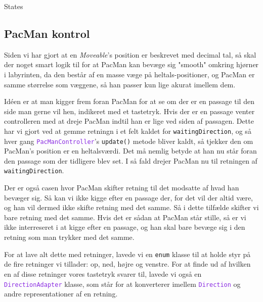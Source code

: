 \documentclass{article}
\newcommand{\code}[1]{\small\texttt{#1}}
\newcommand{\class}[1]{\textcolor{BlueViolet}{\small\texttt{#1}}}
\theoremstyle{mytheoremstyle}
\theoremstyle{mytheoremstyle}
\theoremstyle{myproblemstyle}
\begin{document}
States


\subsection{PacMan kontrol}\label{sub:PacMan Kontrol} %
Siden vi har gjort at en \textit{Moveable}'s position er beskrevet med decimal
tal, så skal der noget smart logik til for at PacMan kan bevæge sig "smooth"
omkring hjørner i labyrinten, da den består af en masse væge på
heltals-positioner, og PacMan er samme størrelse som væggene, så han passer kun
lige akurat imellem dem.

Idéen er at man kigger frem foran PacMan for at se om der er en passage til den
side man gerne vil hen, indikeret med et tastetryk. Hvis der er en passage
venter controlleren med at dreje PacMan indtil han er lige ved siden af
passagen. Dette har vi gjort ved at gemme retningn i et felt kaldet for
\code{waitingDirection}, og så hver gang \class{PacManController}'s
\code{update()} metode bliver kaldt, så tjekker den om PacMan's position er en
heltalsværdi. Det må nemlig betyde at han nu står foran den passage som der
tidligere blev set. I så fald drejer PacMan nu til retningen af
\code{waitingDirection}. 

Der er også casen hvor PacMan skifter retning til det modsatte af hvad han
bevæger sig. Så kan vi ikke kigge efter en passage der, for det vil der altid
være, og han vil dermed ikke skifte retning med det samme. Så i dette tilfælde
skifter vi bare retning med det samme. Hvis det er sådan at PacMan står stille,
så er vi ikke interreseret i at kigge efter en passage, og han skal bare bevæge
sig i den retning som man trykker med det samme.

For at lave alt dette med retninger, lavede vi en \code{enum} klasse til at
holde styr på de fire retninger vi tillader: op, ned, højre og venstre. For at
finde ud af hvilken en af disse retninger vores tastetryk svarer til, lavede vi
også en \class{DirectionAdapter} klasse, som står for at konverterer imellem
\class{Direction} og andre representationer af en retning.
\end{document}
